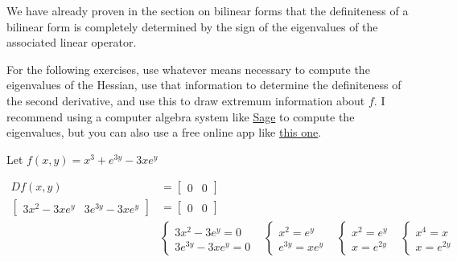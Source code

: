 \documentclass{ximera}
\begin{document}
	We have already proven in the section on bilinear forms that the definiteness of a bilinear form is completely determined by the sign
	of the eigenvalues of the associated linear operator.
	
	For the following exercises, use whatever means necessary to compute the eigenvalues of the Hessian, use that information to determine the 
	definiteness of the second derivative, and use this to draw extremum information about $f$.  I recommend using a computer algebra system like 
	\href{http://www.sagemath.org/}{Sage} to compute the eigenvalues, 
	but you can also use a free online app like \href{http://www.bluebit.gr/matrix-calculator/}{this one}. 
	
	\begin{question}
		Let $f(x,y) = x^3+e^{3y}-3xe^{y}$
		\begin{solution}
			\begin{hint}
				\begin{align*}
					Df(x,y)  &= \begin{bmatrix} 0 & 0\end{bmatrix}\\
					\begin{bmatrix} 3x^2-3xe^y & 3e^{3y}-3xe^y\end{bmatrix} &= \begin{bmatrix} 0 & 0\end{bmatrix}\\
					&\begin{cases}
						3x^2-3e^y = 0\\
						3e^{3y}-3xe^y = 0
					\end{cases}
					&\begin{cases}
						x^2=e^y\\
						e^{3y}=xe^y
					\end{cases}
					&\begin{cases}
						x^2=e^y\\
						x=e^{2y}
					\end{cases}
					&\begin{cases}
						x^4=x\\
						x=e^{2y}
					\end{cases}
				\end{align*}
				

\end{hint}
\end{solution}
\end{question}
\end{document}
